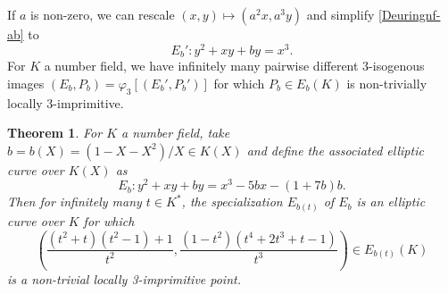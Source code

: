 \documentclass{amsart}
\theoremstyle{plain}
\newtheorem{theorem}{Theorem}[section]
\theoremstyle{definition}
\begin{document}
If $a$ is non-zero, we can rescale 
$(x, y)\mapsto (a^2x, a^3y)$ and simplify \eqref{Deuringnf-ab} to 
\begin{equation}
\label{Deuringnf}
E_b': y^2+xy+by=x^3.
\end{equation}
For $K$ a number field, we have infinitely many pairwise different
3-isogenous images $(E_b, P_b)=\varphi_3[(E_b', P_b')]$ for which
$P_b\in E_b(K)$ is non-trivially locally 3-imprimitive.
\begin{theorem}
\label{ell=3}
For $K$ a number field, take $b=b(X)=(1-X-X^2)/X\in K(X)$ and 
define the associated elliptic curve over $K(X)$ as
$$
E_{b}: y^2+xy+by=x^3-5bx-(1+7b)b.
$$  
Then for infinitely many $t\in K^*$, the specialization $E_{b(t)}$
of $E_b$ is an elliptic curve over $K$ for which
\begin{equation}
\label{pointPt}
    \left(\frac{(t^2+t)(t^2-1)+1}{t^2},
    \frac{(1-t^2)\left(t^4+2 t^3+t-1\right)}{t^3}\right)
\in E_{b(t)}(K)
\end{equation} 
is a non-trivial locally 3-imprimitive point.
\end{theorem}
\end{document}
